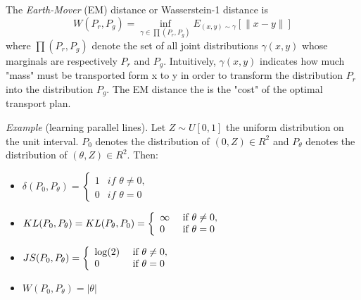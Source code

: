 \documentclass[english]{article}
\begin{document}
\item {The \emph{Earth-Mover} (EM) distance or Wasserstein-1 distance} is
$$W(P_r,P_g)=\inf_{\gamma \in \prod(P_r,P_g)} E_{(x,y)\sim \gamma} [\|x-y\|]$$
where $\prod(P_r,P_g)$ denote the set of all joint distributions $\gamma(x,y)$ whose marginals are respectively $P_r$ and $P_g$. Intuitively, $\gamma(x,y)$ indicates how much "mass" must be transported form x to y in order to transform the distribution $P_r$ into the distribution $P_g$. The EM distance the is the "cost" of the optimal transport plan.





\item { \emph{Example} (learning parallel lines)}.
Let $Z\sim U[0,1]$ the uniform distribution on the unit interval. $P_0$ denotes the distribution of $(0,Z)\in R^2$ and $P_\theta$ denotes the distribution of $(\theta,Z)\in R^2$. Then:
\begin{itemize}
     \item $\delta(P_0,P_\theta)=\left\{ \begin{array}{ll}
             1 & if \,\, \theta \not= 0,\\
             0 & if \,\, \theta =0 \end{array}\right.$
     
   \end{itemize}






\item {}
\begin{itemize}
     \item $KL(P_0,P_\theta)=KL(P_\theta, P_0)=\left\{ \begin{array}{ll}
             \infty & \textnormal{ if } \theta \not= 0,\\
             0 & \textnormal{ if } \theta =0 \end{array}\right.$
    \item $ JS(P_0,P_\theta)=\left\{ \begin{array}{ll}
             \log(2) & \textnormal{ if } \theta \not= 0,\\
             0 & \textnormal{ if } \theta =0 \end{array}\right.$
   \item $ W(P_0,P_\theta)= |\theta|$
\end{itemize}
\end{document}
